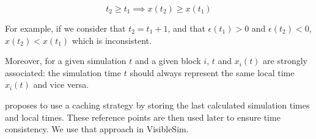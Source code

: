 \documentclass[11pt]{article}
\begin{document}
\begin{equation}
t_2 \geq t_1 \implies x(t_2) \geq x(t_1)
\label{eq:consistency}
\end{equation}

For example, if we consider that $t_2 = t_1 + 1$, and that $\epsilon(t_1) > 0$ and $\epsilon(t_2) < 0$, $x(t_2) < x(t_1)$ which is inconsistent.

Moreover, for a given simulation $t$ and a given block $i$, $t$ and $x_i(t)$ are strongly associated: the simulation time $t$ should always represent the same local time $x_i(t)$ and vice versa.

\cite{ring2010clock} proposes to use a caching strategy by storing the last calculated simulation times and local times. These reference points are then used later to ensure time consistency. We use that approach in VisibleSim.



\end{document}
